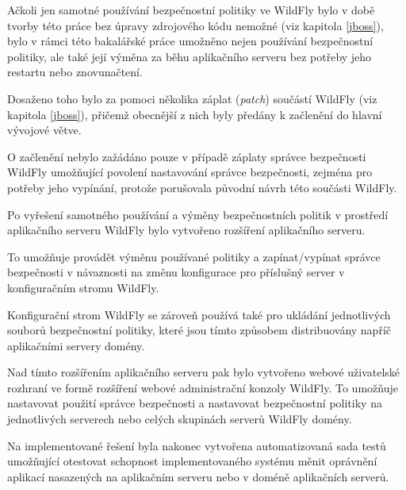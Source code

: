 Ačkoli jen samotné používání bezpečnostní politiky ve WildFly bylo v době tvorby této práce bez úpravy zdrojového kódu nemožné (viz kapitola \ref{jboss}),
bylo v rámci této bakalářské práce umožněno nejen používání bezpečnostní politiky, ale také její výměna za běhu aplikačního serveru bez potřeby
jeho restartu nebo znovunačtení.

Dosaženo toho bylo za pomoci několika záplat ({\it patch}) součástí WildFly (viz kapitola \ref{jboss}), přičemž obecnější z nich byly předány
k začlenění do hlavní vývojové větve. \cite{smPullRequest}\cite{jbossModulesPullRequest}

O začlenění nebylo zažádáno pouze v případě záplaty správce bezpečnosti WildFly umožňující povolení nastavování správce bezpečnosti,
zejména pro potřeby jeho vypínání, protože porušovala původní návrh této součásti WildFly.

Po vyřešení samotného používání a výměny bezpečnostních politik v prostředí aplikačního serveru WildFly bylo vytvořeno rozšíření aplikačního serveru.

To umožňuje provádět výměnu používané politiky a zapínat/vypínat správce bezpečnosti v návaznosti na změnu konfigurace pro příslušný server
v konfiguračním stromu WildFly.

Konfigurační strom WildFly se zároveň používá také pro ukládání jednotlivých souborů bezpečnostní politiky, které jsou tímto způsobem distribuovány napříč aplikačními servery domény.

Nad tímto rozšířením aplikačního serveru pak bylo vytvořeno webové uživatelské rozhraní ve formě rozšíření webové administrační konzoly WildFly.
To umožňuje nastavovat použití správce bezpečnosti a nastavovat bezpečnostní politiky na jednotlivých serverech nebo celých skupinách serverů WildFly domény.

Na implementované řešení byla nakonec vytvořena automatizovaná sada testů umožňující otestovat schopnost implementovaného systému měnit oprávnění
aplikací nasazených na aplikačním serveru nebo v doméně aplikačních serverů.

